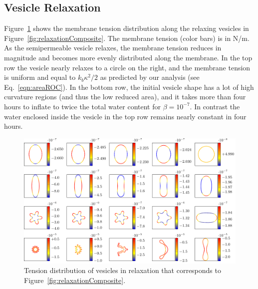 \documentclass[9pt,twocolumn,twoside,lineno]{pnas-new}
\newif\ifTikz
\begin{document}
\subsection*{Vesicle Relaxation}
Figure~\ref{fig:relaxationTensions} shows the membrane tension distribution along the relaxing vesicles in Figure~\ref{fig:relaxationComposite}. 
The membrane tension (color bars) is in N/m. As the semipermeable vesicle relaxes, the membrane tension reduces in magnitude and becomes more
evenly distributed along the membrane. In the top row the vesicle nearly relaxes to a circle on the right, and the membrane tension is uniform and equal to $k_b \kappa^2/2$ as predicted by our analysis (see Eq.~\ref{eqn:areaROC}).
In the bottom row, the initial vesicle shape has a lot of high curvature regions (and thus the low reduced area), and it takes more than four hours to 
inflate to twice the total water content for $\beta=10^{-7}$. In contrast the water enclosed inside the vesicle in the top row remains nearly constant in four hours.
\begin{figure}[htp]
  \centering
  \ifTikz
    
  \else
    \includegraphics{figures/relaxationTensions.pdf}
  \fi
  \caption{\label{fig:relaxationTensions} Tension distribution of vesicles in
  relaxation that corresponds to Figure~\ref{fig:relaxationComposite}.}
\end{figure}
\end{document}
